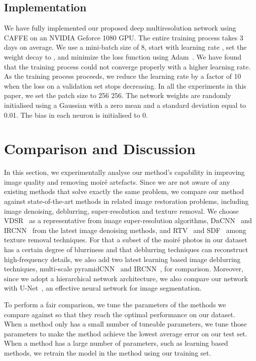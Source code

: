 \documentclass[journal]{IEEEtran}
\begin{document}
\subsection{Implementation} We have fully implemented our proposed deep multiresolution network using CAFFE on an NVIDIA Geforce 1080 GPU. The entire training process takes 3 days on average. We use a mini-batch size of 8, start with learning rate , set the weight decay to , and minimize the loss function using Adam~\cite{kingma2014adam}. We have found that the training process could not converge properly with a higher learning rate. As the training process proceeds, we reduce the learning rate by a factor of 10 when the loss on a validation set stops decreasing. In all the experiments in this paper, we set the patch size  to 256  256. The network weights are randomly initialised using a Gaussian with a zero mean and a standard deviation equal to 0.01. The bias in each neuron is initialised to 0.


\section{Comparison and Discussion}
In this section, we experimentally analyse our method's capability in improving image quality and removing moir\'{e} artefacts. Since we are not aware of any existing methods that solve exactly the same problem, we compare our method against state-of-the-art methods in related image restoration problems, including image denoising, deblurring, super-resolution and texture removal. We choose VDSR~\cite{kim2016accurate} as a representative from image super-resolution algorithms, DnCNN~\cite{zhang2017beyond} and IRCNN~\cite{zhang2017learning} from the latest image denoising methods, and RTV~\cite{xu2012structure} and SDF~\cite{ham2015} among texture removal techniques. For that a subset of the moir\'{e} photos in our dataset has a certain degree of blurriness and that deblurring techniques can reconstruct high-frequency details, we also add two latest learning based image deblurring techniques, multi-scale pyramidCNN~\cite{nah2016deep} and IRCNN~\cite{zhang2017learning}, for comparison. Moreover, since we adopt a hierarchical network architecture, we also compare our network with U-Net~\cite{ronneberger2015u}, an effective neural network for image segmentation.

To perform a fair comparison, we tune the parameters of the methods we compare against so that they reach the optimal performance on our dataset. When a method only has a small number of tuneable parameters, we tune those parameters to make the method achieve the lowest average error on our test set. When a method has a large number of parameters, such as learning based methods, we retrain the model in the method using our training set.
\end{document}
